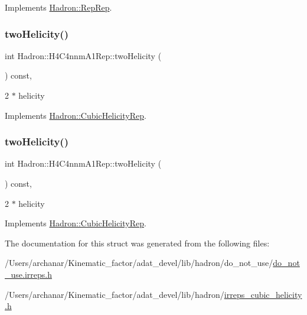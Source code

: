 Implements \mbox{\hyperlink{structHadron_1_1RepRep_ab3213025f6de249f7095892109575fde}{Hadron\+::\+Rep\+Rep}}.

\mbox{\label{structHadron_1_1H4C4nnmA1Rep_a8f570a8c9ad6fc04e9458e44562b8b21}} 
\subsubsection{\texorpdfstring{twoHelicity()}{twoHelicity()}\hspace{0.1cm}{\footnotesize\ttfamily [1/2]}}
{\footnotesize\ttfamily int Hadron\+::\+H4\+C4nnm\+A1\+Rep\+::two\+Helicity (\begin{DoxyParamCaption}{ }\end{DoxyParamCaption}) const\hspace{0.3cm}{\ttfamily [inline]}, {\ttfamily [virtual]}}

2 $\ast$ helicity 

Implements \mbox{\hyperlink{structHadron_1_1CubicHelicityRep_af507aa56fc2747eacc8cb6c96db31ecc}{Hadron\+::\+Cubic\+Helicity\+Rep}}.

\mbox{\label{structHadron_1_1H4C4nnmA1Rep_a8f570a8c9ad6fc04e9458e44562b8b21}} 
\subsubsection{\texorpdfstring{twoHelicity()}{twoHelicity()}\hspace{0.1cm}{\footnotesize\ttfamily [2/2]}}
{\footnotesize\ttfamily int Hadron\+::\+H4\+C4nnm\+A1\+Rep\+::two\+Helicity (\begin{DoxyParamCaption}{ }\end{DoxyParamCaption}) const\hspace{0.3cm}{\ttfamily [inline]}, {\ttfamily [virtual]}}

2 $\ast$ helicity 

Implements \mbox{\hyperlink{structHadron_1_1CubicHelicityRep_af507aa56fc2747eacc8cb6c96db31ecc}{Hadron\+::\+Cubic\+Helicity\+Rep}}.



The documentation for this struct was generated from the following files\+:\begin{DoxyCompactItemize}
\item 
/\+Users/archanar/\+Kinematic\+\_\+factor/adat\+\_\+devel/lib/hadron/do\+\_\+not\+\_\+use/\mbox{\hyperlink{do__not__use_8irreps_8h}{do\+\_\+not\+\_\+use.\+irreps.\+h}}\item 
/\+Users/archanar/\+Kinematic\+\_\+factor/adat\+\_\+devel/lib/hadron/\mbox{\hyperlink{lib_2hadron_2irreps__cubic__helicity_8h}{irreps\+\_\+cubic\+\_\+helicity.\+h}}\end{DoxyCompactItemize}
